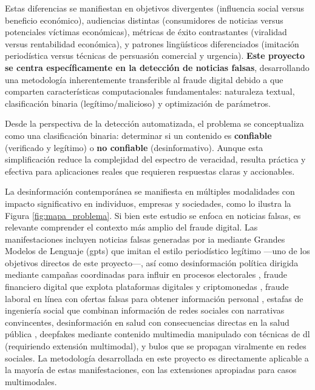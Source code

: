 Estas diferencias se manifiestan en objetivos divergentes (influencia social versus beneficio económico), audiencias distintas (consumidores de noticias versus potenciales víctimas económicas), métricas de éxito contrastantes (viralidad versus rentabilidad económica), y patrones lingüísticos diferenciados (imitación periodística versus técnicas de persuasión comercial y urgencia). \textbf{Este proyecto se centra específicamente en la detección de noticias falsas}, desarrollando una metodología inherentemente transferible al fraude digital debido a que comparten características computacionales fundamentales: naturaleza textual, clasificación binaria (legítimo/malicioso) y optimización de parámetros.

Desde la perspectiva de la detección automatizada, el problema se conceptualiza como una clasificación binaria: determinar si un contenido es \textbf{confiable} (verificado y legítimo) o \textbf{no confiable} (desinformativo). Aunque esta simplificación reduce la complejidad del espectro de veracidad, resulta práctica y efectiva para aplicaciones reales que requieren respuestas claras y accionables.

La desinformación contemporánea se manifiesta en múltiples modalidades con impacto significativo en individuos, empresas y sociedades, como lo ilustra la Figura \ref{fig:mapa_problema}. Si bien este estudio se enfoca en noticias falsas, es relevante comprender el contexto más amplio del fraude digital. Las manifestaciones incluyen noticias falsas generadas por \gls{ia} mediante Grandes Modelos de Lenguaje (\glspl{gpt}) que imitan el estilo periodístico legítimo \cite{su2023fake} —uno de los objetivos directos de este proyecto—, así como desinformación política dirigida mediante campañas coordinadas para influir en procesos electorales \cite{carcamo2021fake}, fraude financiero digital que explota plataformas digitales y criptomonedas \cite{cao2020corporate}, fraude laboral en línea con ofertas falsas para obtener información personal \cite{nasser2021online}, estafas de ingeniería social que combinan información de redes sociales con narrativas convincentes, desinformación en salud con consecuencias directas en la salud pública \cite{pulido2020new}, \glspl{deepfake} mediante contenido multimedia manipulado con técnicas de \gls{dl} (requiriendo extensión multimodal), y \glspl{bulo} que se propagan viralmente en redes sociales. La metodología desarrollada en este proyecto es directamente aplicable a la mayoría de estas manifestaciones, con las extensiones apropiadas para casos multimodales.

